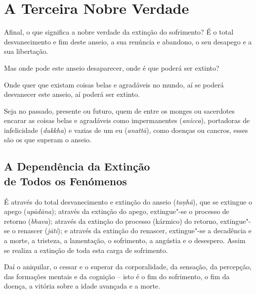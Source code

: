 
\chapter{A Terceira Nobre Verdade}


Afinal, o que significa a nobre verdade da extinção do sofrimento? É o total
desvanecimento e fim deste anseio, a sua renúncia e abandono, o seu desapego e a
sua libertação.

Mas onde pode este anseio desaparecer, onde é que poderá ser extinto?

Onde quer que existam coisas belas e agradáveis no mundo, aí se poderá desvanecer este anseio, aí poderá ser extinto.


Seja no passado, presente ou futuro, quem de entre os monges ou sacerdotes
encarar as coisas belas e agradáveis como impermanentes (\emph{anicca}),
portadoras de infelicidade (\emph{dukkha}) e vazias de um eu (\emph{anattā}),
como doenças ou cancros, esses são os que superam o anseio.


\section{A Dependência da Extinção\\ de Todos os Fenómenos}

É através do total desvanecimento e extinção do anseio (\emph{taṇhā}), que se
extingue o apego (\emph{upādāna}); através da extinção do apego, extingue"-se o
processo de retorno (\emph{bhava}); através da extinção do processo (kármico) do
retorno, extingue"-se o renascer (\emph{jāti}); e através da extinção do
renascer, extingue"-se a decadência e a morte, a tristeza, a lamentação, o
sofrimento, a angústia e o desespero. Assim se realiza a extinção de toda esta
carga de sofrimento.


Daí o aniquilar, o cessar e o superar da corporalidade, da sensação, da
percepção, das formações mentais e da cognição -- isto é o fim do sofrimento, o
fim da doença, a vitória sobre a idade avançada e a morte.



